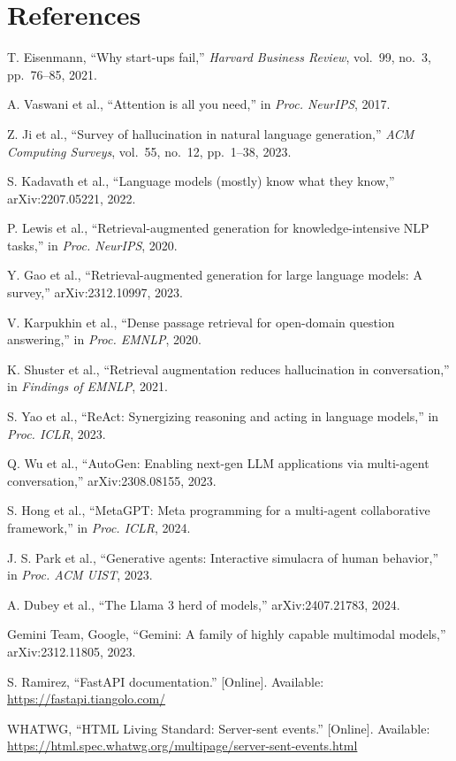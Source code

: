 \section*{References}
{\footnotesize\raggedright
\begin{enumerate}[label={[\arabic*]},leftmargin=2.2em,itemsep=1pt]
\item T. Eisenmann, ``Why start-ups fail,'' \textit{Harvard Business Review}, vol.~99, no.~3, pp.~76--85, 2021.
\item A. Vaswani et al., ``Attention is all you need,'' in \textit{Proc. NeurIPS}, 2017.
\item Z. Ji et al., ``Survey of hallucination in natural language generation,'' \textit{ACM Computing Surveys}, vol.~55, no.~12, pp.~1--38, 2023.
\item S. Kadavath et al., ``Language models (mostly) know what they know,'' arXiv:2207.05221, 2022.
\item P. Lewis et al., ``Retrieval-augmented generation for knowledge-intensive NLP tasks,'' in \textit{Proc. NeurIPS}, 2020.
\item Y. Gao et al., ``Retrieval-augmented generation for large language models: A survey,'' arXiv:2312.10997, 2023.
\item V. Karpukhin et al., ``Dense passage retrieval for open-domain question answering,'' in \textit{Proc. EMNLP}, 2020.
\item K. Shuster et al., ``Retrieval augmentation reduces hallucination in conversation,'' in \textit{Findings of EMNLP}, 2021.
\item S. Yao et al., ``ReAct: Synergizing reasoning and acting in language models,'' in \textit{Proc. ICLR}, 2023.
\item Q. Wu et al., ``AutoGen: Enabling next-gen LLM applications via multi-agent conversation,'' arXiv:2308.08155, 2023.
\item S. Hong et al., ``MetaGPT: Meta programming for a multi-agent collaborative framework,'' in \textit{Proc. ICLR}, 2024.
\item J. S. Park et al., ``Generative agents: Interactive simulacra of human behavior,'' in \textit{Proc. ACM UIST}, 2023.
\item A. Dubey et al., ``The Llama 3 herd of models,'' arXiv:2407.21783, 2024.
\item Gemini Team, Google, ``Gemini: A family of highly capable multimodal models,'' arXiv:2312.11805, 2023.
\item S. Ramirez, ``FastAPI documentation.'' [Online]. Available: \url{https://fastapi.tiangolo.com/}
\item WHATWG, ``HTML Living Standard: Server-sent events.'' [Online]. Available: \url{https://html.spec.whatwg.org/multipage/server-sent-events.html}
\end{enumerate}}
